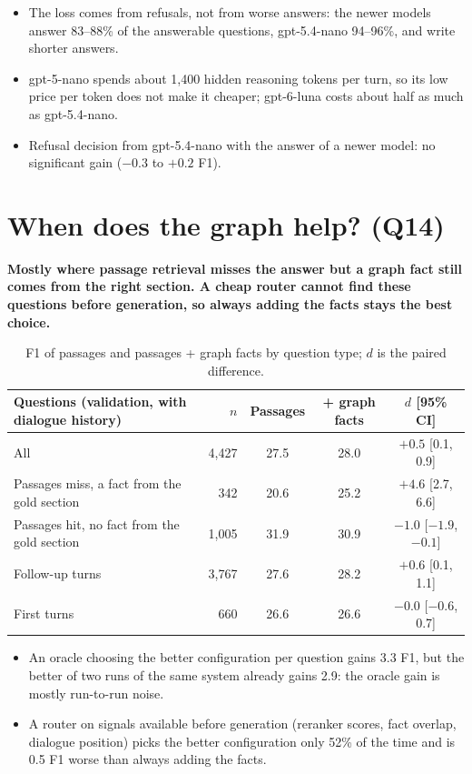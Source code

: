\documentclass[11pt,a4paper]{article}
\begin{document}
\begin{itemize}
\item The loss comes from refusals, not from worse answers: the newer models answer 83--88\% of
  the answerable questions, gpt-5.4-nano 94--96\%, and write shorter answers.
\item gpt-5-nano spends about 1,400 hidden reasoning tokens per turn, so its low price per token
  does not make it cheaper; gpt-6-luna costs about half as much as gpt-5.4-nano.
\item Refusal decision from gpt-5.4-nano with the answer of a newer model: no significant gain
  ($-0.3$ to $+0.2$ F1).
\end{itemize}

\section{When does the graph help? (Q14)}\label{sec:graphhelp}

\textbf{Mostly where passage retrieval misses the answer but a graph fact still comes from the
right section. A cheap router cannot find these questions before generation, so always adding the
facts stays the best choice.}

\begin{table}[H]
\centering\small
\begin{tabular}{lrccc}
\toprule
Questions (validation, with dialogue history) & $n$ & Passages & + graph facts & $d$ [95\% CI] \\
\midrule
All & 4,427 & 27.5 & 28.0 & $+0.5$ [0.1, 0.9] \\
Passages miss, a fact from the gold section & 342 & 20.6 & 25.2 & $+4.6$ [2.7, 6.6] \\
Passages hit, no fact from the gold section & 1,005 & 31.9 & 30.9 & $-1.0$ [$-1.9$, $-0.1$] \\
Follow-up turns & 3,767 & 27.6 & 28.2 & $+0.6$ [0.1, 1.1] \\
First turns & 660 & 26.6 & 26.6 & $-0.0$ [$-0.6$, 0.7] \\
\bottomrule
\end{tabular}
\caption{F1 of passages and passages + graph facts by question type; $d$ is the paired difference.}
\label{tab:graphhelp}
\end{table}

\begin{itemize}
\item An oracle choosing the better configuration per question gains 3.3 F1, but the better of two
  runs of the same system already gains 2.9: the oracle gain is mostly run-to-run noise.
\item A router on signals available before generation (reranker scores, fact overlap, dialogue
  position) picks the better configuration only 52\% of the time and is 0.5 F1 worse than always
  adding the facts.
\end{itemize}
\end{document}
